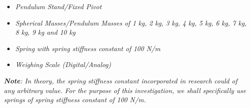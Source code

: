 \begin{itemize}
    \item \textit{Pendulum Stand/Fixed Pivot}
    \item \textit{Spherical Masses/Pendulum Masses of 1 kg, 2 kg, 3 kg, 4 kg, 5 kg, 6 kg, 7 kg, 8 kg, 9 kg and 10 kg}
    \item \textit{Spring with spring stiffness constant of 100 N/m}
    \item \textit{Weighing Scale (Digital/Analog)}
    \label{mat}
\end{itemize}

\textit{\textbf{Note}: In theory, the spring stiffness constant incorporated in research could of any arbitrary value. For the purpose of this investigation, we shall specifically use springs of spring stiffness constant of 100 N/m.}


